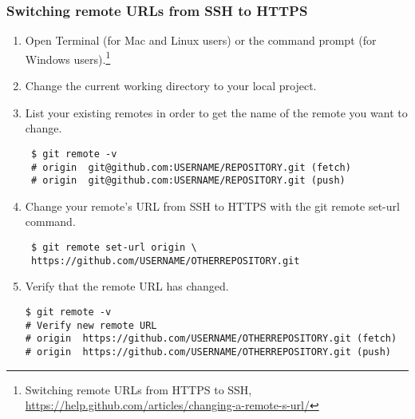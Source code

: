 \documentclass[12pt,letterpaper,dvips]{article}
\begin{document}
\subsubsection{Switching remote URLs from SSH to HTTPS}
\begin{enumerate}
  \item{Open Terminal (for Mac and Linux users) or the command prompt
       (for Windows users).\footnote{Switching remote URLs from HTTPS to SSH,
       \href{https://help.github.com/articles/changing-a-remote-s-url/}{https://help.github.com/articles/changing-a-remote-s-url/}}}
  \item{Change the current working directory to your local project.}
  \item{List your existing remotes in order to get the name of the remote you want to change.
\begin{Verbatim}
 $ git remote -v
 # origin  git@github.com:USERNAME/REPOSITORY.git (fetch)
 # origin  git@github.com:USERNAME/REPOSITORY.git (push)
\end{Verbatim}
       }
  \item{Change your remote's URL from SSH to HTTPS with the git remote set-url command.
\begin{Verbatim}
 $ git remote set-url origin \
 https://github.com/USERNAME/OTHERREPOSITORY.git
\end{Verbatim}
      }

  \item{Verify that the remote URL has changed.
\begin{Verbatim}
$ git remote -v
# Verify new remote URL
# origin  https://github.com/USERNAME/OTHERREPOSITORY.git (fetch)
# origin  https://github.com/USERNAME/OTHERREPOSITORY.git (push)
\end{Verbatim}
       }
\end{enumerate}


\newpage
\end{document}
